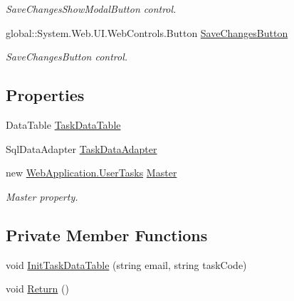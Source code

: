 \begin{DoxyCompactItemize}
\begin{DoxyCompactList}\small\item\em Save\+Changes\+Show\+Modal\+Button control. \end{DoxyCompactList}\item 
global\+::\+System.\+Web.\+U\+I.\+Web\+Controls.\+Button \mbox{\hyperlink{classWebApplication_1_1UserPage_1_1InstanciarTarea_a918404ca052ee1799aefc531a9e06d5a}{Save\+Changes\+Button}}
\begin{DoxyCompactList}\small\item\em Save\+Changes\+Button control. \end{DoxyCompactList}\end{DoxyCompactItemize}
\subsection*{Properties}
\begin{DoxyCompactItemize}
\item 
Data\+Table \mbox{\hyperlink{classWebApplication_1_1UserPage_1_1InstanciarTarea_a079c2ac82dc950ae13a0ba75b015f9b7}{Task\+Data\+Table}}
\item 
Sql\+Data\+Adapter \mbox{\hyperlink{classWebApplication_1_1UserPage_1_1InstanciarTarea_a3fadf343ca9a543ed48897c69c7253a4}{Task\+Data\+Adapter}}
\item 
new \mbox{\hyperlink{classWebApplication_1_1UserTasks}{Web\+Application.\+User\+Tasks}} \mbox{\hyperlink{classWebApplication_1_1UserPage_1_1InstanciarTarea_a5e1a64ee6224dcb58dbadb10c5958e69}{Master}}
\begin{DoxyCompactList}\small\item\em Master property. \end{DoxyCompactList}\end{DoxyCompactItemize}
\subsection*{Private Member Functions}
\begin{DoxyCompactItemize}
\item 
void \mbox{\hyperlink{classWebApplication_1_1UserPage_1_1InstanciarTarea_a2e38df38d916af37f9fc3f81b6e1dacb}{Init\+Task\+Data\+Table}} (string email, string task\+Code)
\item 
void \mbox{\hyperlink{classWebApplication_1_1UserPage_1_1InstanciarTarea_a8d982050460e5682b8ddfe2bf77a9053}{Return}} ()
\end{DoxyCompactItemize}
